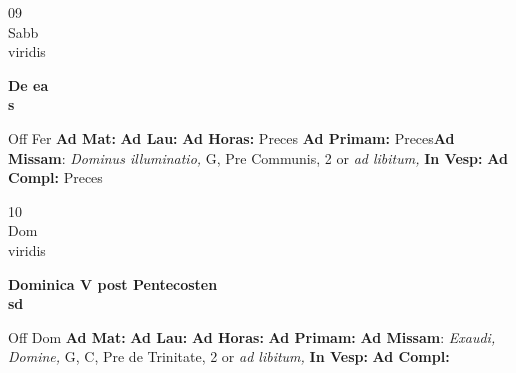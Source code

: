 \documentclass[10pt, openany]{book}
\begin{document}
    \begin{center}
        \begin{minipage}{3.5in}
            \vspace{2em}
            \begin{minipage}{0.5in}
                {\Huge 09} \\
                {\normalsize Sabb} \\
                {\normalsize viridis}
            \end{minipage}
            \begin{minipage}{3.0in}
                \textbf{ \large De ea \\
                \textnormal{\normalsize s}} \\ 
            \end{minipage}
            \begin{justify}Off Fer
                \textbf{Ad Mat: }
                \textbf{Ad Lau: }
                \textbf{Ad Horas: }Preces
                \textbf{Ad Primam: }Preces\textbf{Ad Missam}: \textit{Dominus illuminatio,} G, Pre Communis, 2 or \textit{ad libitum,}  
                \textbf{In Vesp: }
                \textbf{Ad Compl: }Preces
            \end{justify}
        \end{minipage}
    \end{center}

    \begin{center}
        \begin{minipage}{3.5in}
            \vspace{2em}
            \begin{minipage}{0.5in}
                {\Huge 10} \\
                {\normalsize Dom} \\
                {\normalsize viridis}
            \end{minipage}
            \begin{minipage}{3.0in}
                \textbf{ \large Dominica V post Pentecosten \\
                \textnormal{\normalsize sd}} \\ 
            \end{minipage}
            \begin{justify}Off Dom
                \textbf{Ad Mat: }
                \textbf{Ad Lau: }
                \textbf{Ad Horas: }
                \textbf{Ad Primam: }\textbf{Ad Missam}: \textit{Exaudi, Domine,} G, C, Pre de Trinitate, 2 or \textit{ad libitum,}  
                \textbf{In Vesp: }
                \textbf{Ad Compl: }
            \end{justify}
        \end{minipage}
    \end{center}
\end{document}
